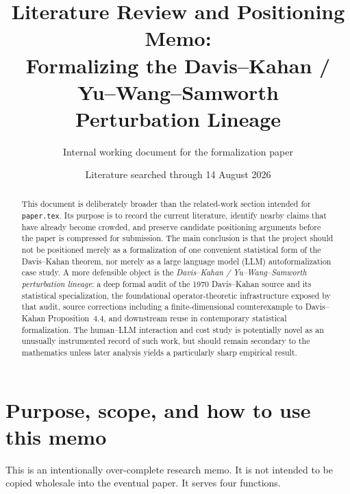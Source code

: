 \documentclass[11pt]{article}
\title{Literature Review and Positioning Memo:\\
Formalizing the Davis--Kahan / Yu--Wang--Samworth\\
Perturbation Lineage}
\author{Internal working document for the formalization paper}
\date{Literature searched through 14 August 2026}
\begin{document}
\maketitle

\begin{abstract}
This document is deliberately broader than the related-work section intended for
\texttt{paper.tex}.  Its purpose is to record the current literature, identify
nearby claims that have already become crowded, and preserve candidate
positioning arguments before the paper is compressed for submission.  The main
conclusion is that the project should not be positioned merely as a formalization
of one convenient statistical form of the Davis--Kahan theorem, nor merely as a
large language model (LLM) autoformalization case study.  A more defensible
object is the \emph{Davis--Kahan / Yu--Wang--Samworth perturbation lineage}:
a deep formal audit of the 1970 Davis--Kahan source and its statistical
specialization, the foundational operator-theoretic infrastructure exposed by
that audit, source corrections including a finite-dimensional counterexample to
Davis--Kahan Proposition~4.4, and downstream reuse in contemporary statistical
formalization.  The human--LLM interaction and cost study is potentially novel
as an unusually instrumented record of such work, but should remain secondary
to the mathematics unless later analysis yields a particularly sharp empirical
result.
\end{abstract}

\tableofcontents
\clearpage

\section{Purpose, scope, and how to use this memo}
\label{sec:purpose}

This is an intentionally over-complete research memo.  It is not intended to be
copied wholesale into the eventual paper.  It serves four functions.
\end{document}

